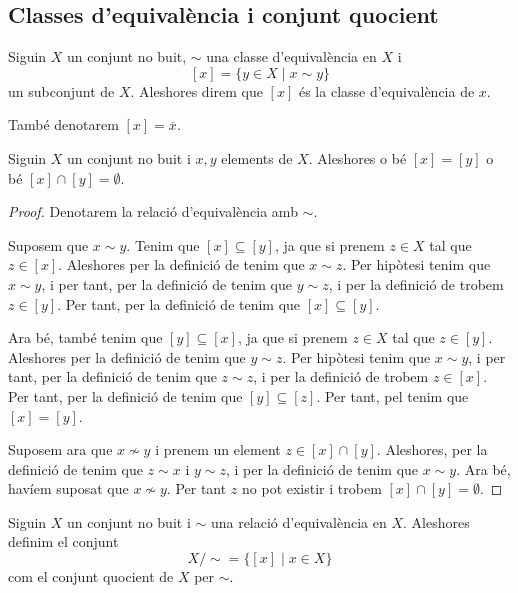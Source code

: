 \documentclass[../../Main.tex]{subfiles}
\begin{document}
	\subsection{Classes d'equivalència i conjunt quocient}
	\begin{definition}
		\label{def:classe d'equivalència}
		Siguin \(X\) un conjunt no buit, \(\sim\) una classe d'equivalència en \(X\) i
		\[[x]=\{y\in X\mid x\sim y\}\]
		un subconjunt de \(X\). Aleshores direm que \([x]\) és la classe d'equivalència de \(x\).
		
		També denotarem \([x]=\overline{x}\).
	\end{definition}
	\begin{proposition}
		Siguin \(X\) un conjunt no buit i \(x,y\) elements de \(X\). Aleshores o bé \([x]=[y]\) o bé \([x]\cap[y]=\emptyset\).
		\begin{proof}
			Denotarem la relació d'equivalència amb \(\sim\).
			
			Suposem que \(x\sim y\). Tenim que \([x]\subseteq[y]\), ja que si prenem \(z\in X\) tal que \(z\in[x]\). Aleshores per la definició de  tenim que \(x\sim z\). Per hipòtesi tenim que \(x\sim y\), i per tant, per la definició de  tenim que \(y\sim z\), i per la definició de  trobem \(z\in[y]\). Per tant, per la definició de  tenim que \([x]\subseteq[y]\).
			
			Ara bé, també tenim que \([y]\subseteq[x]\), ja que si prenem \(z\in X\) tal que \(z\in[y]\). Aleshores per la definició de  tenim que \(y\sim z\). Per hipòtesi tenim que \(x\sim y\), i per tant, per la definició de  tenim que \(z\sim z\), i per la definició de  trobem \(z\in[x]\). Per tant, per la definició de  tenim que \([y]\subseteq[z]\). Per tant, pel  tenim que \([x]=[y]\).
			
			Suposem ara que \(x\nsim y\) i prenem un element \(z\in[x]\cap[y]\). Aleshores, per la definició de  tenim que \(z\sim x\) i \(y\sim z\), i per la definició de  tenim que \(x\sim y\). Ara bé, havíem suposat que \(x\nsim y\). Per tant \(z\) no pot existir i trobem \([x]\cap[y]=\emptyset\).
		\end{proof}
	\end{proposition}
	\begin{definition}
		\label{def:conjunt quocient}
		Siguin \(X\) un conjunt no buit i \(\sim\) una relació d'equivalència en \(X\). Aleshores definim el conjunt
		\[X/\sim=\{[x]\mid x\in X\}\]
		com el conjunt quocient de \(X\) per \(\sim\).
	\end{definition}
\end{document}
